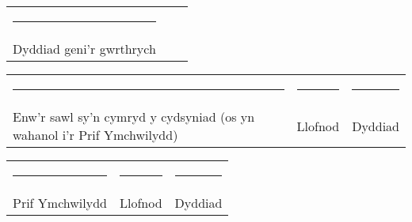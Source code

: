 \documentclass[a4paper,10pt]{article}
\begin{document}
\vspace{0.5cm}

 \begin{tabular}{p{4cm}p{4cm}p{4cm}}
    \rule{10em}{.3pt} & &  \\
     Dyddiad geni'r gwrthrych  & &  \\
 \end{tabular}

\vspace{0.5cm}

 \begin{tabular}{p{4cm}p{4cm}p{4cm}}
    \rule{10em}{.3pt} & \rule{10em}{.3pt} & \rule{10em}{.3pt} \\
     Enw'r sawl sy'n cymryd y cydsyniad (os yn wahanol i'r Prif Ymchwilydd) & Llofnod &  Dyddiad \\
\end{tabular}

\vspace{0.5cm}

 \begin{tabular}{p{4cm}p{4cm}p{4cm}}
    \rule{10em}{.3pt} & \rule{10em}{.3pt} & \rule{10em}{.3pt} \\
     Prif Ymchwilydd & Llofnod & Dyddiad \\
 \end{tabular}
\end{document}
